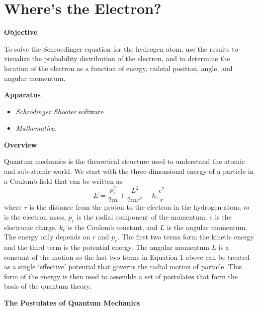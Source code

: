 \setcounter{equation}{0}
\setcounter{figure}{0}

\section{Where's the Electron?}

\makelabheader %

\textbf{Objective}

To solve the Schroedinger equation for the hydrogen atom,
use the results to visualize the probability distribution of the electron, and to
determine the location of the electron as a function of energy, radeial position, angle, 
and angular momentum.

\textbf{Apparatus}

\begin{itemize}

\item {\it Schr\"odinger Shooter} software

\item {\it Mathematica}.

\end{itemize}

\textbf{Overview}

Quantum mechanics is the theoretical structure used to understand the atomic and sub-atomic
world. 
We start with the three-dimensional
energy of a particle in a Coulomb field that can be written as
\begin{equation}
E = \frac{p_r^2}{2m} + \frac{L^2}{2mr^2} - k_e\frac{e^2}{r}
\end{equation}\label{eq:probdens1}
\noindent where $r$ is the distance from the proton to the electron in the hydrogen atom,
$m$ is the electron mass, $p_r$ is the radial component of the momentum, 
$e$ is the electronic charge, $k_e$ is the Coulomb constant, and
$L$ is the angular momentum.
The energy only depends on $r$ and $p_r$.
The first two terms form the kinetic energy and the third term is the potential energy.
The angular momentum $L$ is a constant of the motion so the last two terms in 
Equation 1 above can be treated as a single `effective' potential 
that governs the radial motion of particle.
This form of the energy is then used to assemble a set of postulates that form
the basis of the quantum theory.

\begin{center}
{\bf The Postulates of Quantum Mechanics}
\end{center}

